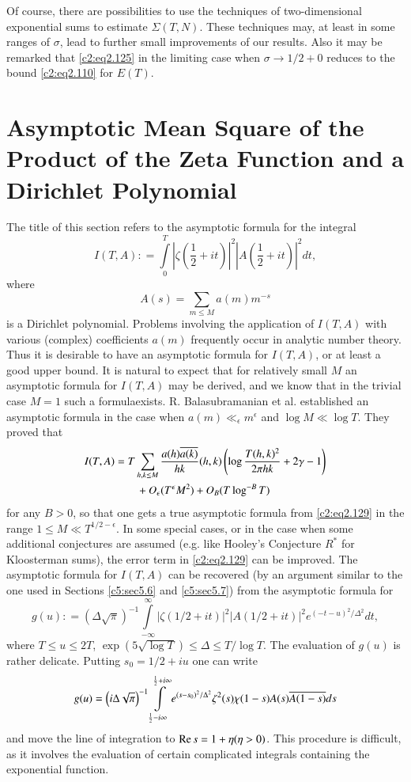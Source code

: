 Of course, there are possibilities to use the techniques of
two-dimen\-sional exponential sums to estimate $\Sigma (T, N)$. These
techniques may, at least in some ranges of $\sigma$, lead to further
small improvements of our results. Also it may be remarked that
\eqref{c2:eq2.125} in the limiting case when $\sigma \to 1/2 + 0$
reduces to the bound \eqref{c2:eq2.110} for $E(T)$.

\section[Asymptotic Mean Square of the Product....]{Asymptotic Mean
  Square of the Product of the Zeta Function 
  and a Dirichlet Polynomial}\label{c2:sec2.8}

The title of this section refers to the asymptotic formula for the
integral
$$
 I (T, A) : = \int\limits_0^T \left|\zeta \left(\frac{1}{2} + it\right)\right|^2 \left|A \left(\frac{1}{2} + it\right)\right|^2 dt,
$$
where
$$
A(s) = \sum_{m \leq M} a (m) m^{-s}
$$
is a Dirichlet polynomial. Problems involving the application of $I(T,
A)$ with various (complex) coefficients $a(m)$ frequently occur in
analytic number theory. Thus it is desirable to have an asymptotic
formula for $I(T, A)$, or at least a good upper bound. It is natural
to expect that for relatively small $M$ an asymptotic formula for
$I(T, A)$ may be derived, and we know that in the trivial case $M=1$
such a formula\pageoriginale exists. R. Balasubramanian et
al. \cite{Balasubramanian1} established an asymptotic formula in the case when
$a(m)\ll_\epsilon m^\epsilon$ and $\log M \ll \log T$. They proved
that 
\begin{align}
  I (T, A) & = T \sum_{h, k \leq M} \frac{a(h)\overline{a(k)}}{hk} (h, k) \left(\log
  \frac{T(h, k)^2}{2 \pi hk}+ 2 \gamma -1\right)\notag\\
  & \qquad + O_\epsilon (T^\epsilon M^2) + O_B (T
  \log^{-B}T)\label{c2:eq2.129} 
\end{align}
for any $B> 0$, so that one gets a true asymptotic formula from
\eqref{c2:eq2.129} in the range $1 \leq M \ll T^{1/2 - \epsilon}$. In
some special cases, or in the case when some additional conjectures
are assumed (e.g. like Hooley's Conjecture $R^*$ for Kloosterman
sums), the error term in \eqref{c2:eq2.129} can be improved. The
asymptotic formula for $I (T, A)$ can be recovered (by an argument
similar to the one used in Sections \ref{c5:sec5.6} and
\ref{c5:sec5.7}) from the asymptotic formula for
$$
g(u) : = \left(\Delta  \sqrt{\pi}\right)^{-1} \int\limits_{- \infty}^\infty
|\zeta (1/2 + it)|^2 |A(1/2 + it)|^2 e^{(- t-u)^2/\Delta ^2}dt,
$$
where $T \leq u \leq 2T$, $\exp (5 \sqrt{\log T}) \leq \Delta  \leq
T/\log T$. The evaluation of $g(u)$ is rather delicate. Putting $s_0 =
1/2 + iu$ one can write
$$ 
g(u) = \left(i \Delta  \sqrt{\pi}\right)^{-1} \int\limits_{\frac{1}{2} - i \infty}^{\frac{1}{2}
+ i \infty} e^{(s-s_0)^2/\Delta ^2} \zeta^2 (s) \chi (1-s)
A(s)\overline{A(1-s)} ds
$$
and move the line of integration to $\operatorname{Re} s=1+ \eta (\eta>0)$. This
procedure is difficult, as it involves the evaluation of certain
complicated integrals containing the exponential function.

